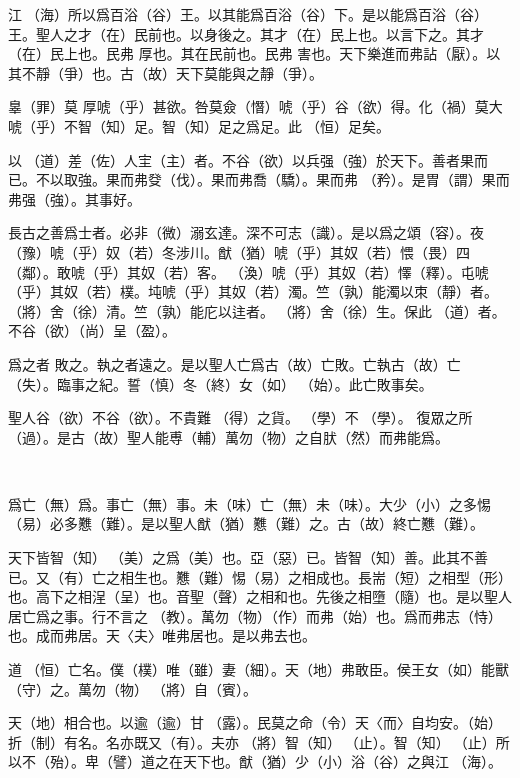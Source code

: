 \documentclass[a4paper]{ctexart}
\begin{document}
    江𣳠（海）所以爲百浴（谷）王。以其能爲百浴（谷）下。是以能爲百浴（谷）王。聖人之才（在）民前也。以身後之。其才（在）民上也。以言下之。其才（在）民上也。民弗 厚也。其在民前也。民弗 害也。天下樂進而弗詀（厭）。以其不靜（爭）也。古（故）天下莫能與之靜（爭）。

    辠（罪）莫 厚唬（乎）甚欲。咎莫僉（憯）唬（乎）谷（欲）得。化（禍）莫大唬（乎）不智（知）足。智（知）足之爲足。此𠄨（恒）足矣。

    以𧗟（道）差（佐）人宔（主）者。不谷（欲）以兵强（強）於天下。善者果而已。不以取強。果而弗癹（伐）。果而弗喬（驕）。果而弗 （矜）。是胃（謂）果而弗强（強）。其事好。

    長古之善爲士者。必非（微）溺玄達。深不可志（識）。是以爲之頌（容）。夜（豫）唬（乎）奴（若）冬涉川。猷（猶）唬（乎）其奴（若）愄（畏）四𠳵（鄰）。敢唬（乎）其奴（若）客。 （渙）唬（乎）其奴（若）懌（釋）。屯唬（乎）其奴（若）樸。坉唬（乎）其奴（若）濁。竺（孰）能濁以朿（靜）者。𨟻（將）舍（徐）清。竺（孰）能庀以迬者。𨟻（將）舍（徐）生。保此𧗟（道）者。不谷（欲）（尚）呈（盈）。

    爲之者 敗之。執之者遠之。是以聖人亡爲古（故）亡敗。亡執古（故）亡󶴡（失）。臨事之紀。誓（慎）冬（終）女（如） （始）。此亡敗事矣。

    聖人谷（欲）不谷（欲）。不貴難𠭁（得）之貨。𡥈（學）不𡥈（學）。 復眾之所（過）。是古（故）聖人能尃（輔）萬勿（物）之自肰（然）而弗能爲。

    𧗟（道）𠄨（恒）亡爲也。侯王能守之。而萬勿（物）𨟻（將）自𢡺（化）。𢡺（化）而𨿜（欲） （作）。𨟻（將）貞（鎮）之以亡名之 （樸）。夫亦𨟻（將）智（知）足。智（知）足以朿（靜）。萬勿（物）𨟻（將）自定。

    爲亡（無）爲。事亡（無）事。未（味）亡（無）未（味）。大少（小）之多惕（易）必多戁（難）。是以聖人猷（猶）戁（難）之。古（故）終亡戁（難）。

    天下皆智（知）𢼸（美）之爲（美）也。亞（惡）已。皆智（知）善。此其不善已。又（有）亡之相生也。戁（難）惕（易）之相成也。長耑（短）之相型（形）也。高下之相浧（呈）也。音聖（聲）之相和也。先後之相墮（隨）也。是以聖人居亡爲之事。行不言之𡥈（教）。萬勿（物）（作）而弗（始）也。爲而弗志（恃）也。成而弗居。天〈夫〉唯弗居也。是以弗去也。

    道𠄨（恒）亡名。僕（樸）唯（雖）妻（細）。天（地）弗敢臣。侯王女（如）能獸（守）之。萬勿（物）𨟻（將）自（賓）。

    天（地）相合也。以逾（逾）甘𩂣（露）。民莫之命（令）天〈而〉自均安。（始）折（制）有名。名亦既又（有）。夫亦𨟻（將）智（知）𣥕（止）。智（知）𣥕（止）所以不（殆）。卑（譬）道之在天下也。猷（猶）少（小）浴（谷）之與江𣳠（海）。
\end{document}
